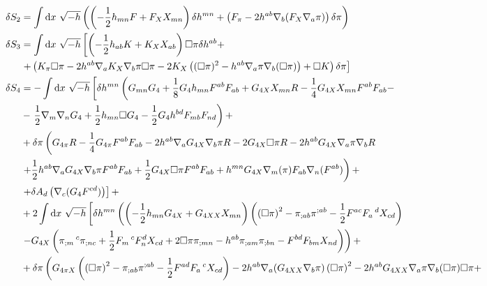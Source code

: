 \documentclass[12pt,a4paper,svgnames]{extarticle}
\begin{document}
\begin{footnotesize}
	\begin{align*}
	 \delta S_{2}& = \int{\rm d}x\,\, \sqrt{-h} \left( \left({ - \frac{1}{2}h_{m n} F+F_{X} X_{m n}}\right)\delta h^{m n}+  \left(F_{\pi}-2h^{a b} \nabla_{b}(F_{X} \nabla_{a}{\pi})\right)\delta\pi\right)\\
	 \delta S_{3} &= \int {\rm d}x\,\, \sqrt{-h}\left[\left( -\frac{1}{2}h_{a b} K + K_{X} X_{a b} \right)\Box{\pi}\delta{h^{a b}}+\right.\\
	& \left.+\left(K_{\pi} \Box\pi -2 h^{a b}\nabla_{a}{K_{X}}\nabla_{b}{\pi}\Box{\pi} - 2 K_{X} \left((\Box{\pi})^2-h^{a b}\nabla_{a}{\pi}\nabla_{b}(\Box{\pi}) \right) + \Box{K} \right)\delta{\pi} \right]\\
	\delta S_{4}& = -\int {\rm d}x\,\, \sqrt{-h}\left[\delta h^{m n} \left(G_{m n}G_{4} +\frac{1}{8}{G_{4}}  h_{m n} F^{a b} F_{a b} + G_{4X} X_{m n} R - \frac{1}{4}G_{4X} X_{m n} F^{a b} F_{a b} - \right.\right.\\
	&-\left. \frac{1}{2}\nabla_{m}\nabla_{n}G_{4} + \frac{1}{2} h_{m n} \Box{G_{4}} - \frac{1}{2}{G_{4}}h^{b d}F_{m b} F_{n d} \right) + \\
	&+ \delta{\pi}\left(G_{4\pi} R - \frac{1}{4}G_{4\pi} F^{a b} F_{a b} -2h^{a b} \nabla_{a}{G_{4X}} \nabla_{b}{\pi} R-2 G_{4X} \Box{\pi} R -2h^{a b} G_{4X} \nabla_{a}{\pi} \nabla_{b}{R}\right.\\
	& \left.+\frac{1}{2}h^{a b} \nabla_{a}{G_{4X}} \nabla_{b}{\pi} F^{a b} F_{a b} +\frac{1}{2} G_{4X} \Box{\pi} F^{a b} F_{a b} +h^{m n} G_{4X} \nabla_{m}{(\pi)} F_{a b}\nabla_{n}{(F^{a b})}\right)+\\
	& \left.+ \delta{A_{d}}\left(\nabla_{c}(G_{4}F^{c d})\right) \right] +\\
	&+ 2 \int {\rm d}x\,\, \sqrt{-h}\left[\delta h^{m n}\left(\left(- \frac{1}{2}h_{m n} G_{4X} + G_{4XX} X_{m n}\right)\left(\left(\Box{\pi}\right)^{2} - \pi_{;a b}\pi^{;a b} - \frac{1}{2} F^{a c} F_{a}\,^{d}X_{c d} \right) \right.\right.\\
	&\left.  -G_{4X} \left(\pi_{;m}\,^{c}\pi_{;n c}  + \frac{1}{2}  F_{m}\,^{c} F_{n}^{d} X_{c d} + 2\Box{\pi} \pi_{;m n} - h^{a b} \pi_{;a m}\pi_{;b n} -  F^{b d}F_{b m}   X_{n d}\right)\right) +\\
	& +\delta\pi \left(G_{4\pi X} \left(\left(\Box{\pi}\right)^{2} -\pi_{;a b}\pi^{;a b}- \frac{1}{2} F^{a d} F_{a}\,^{c} X_{c d}\right) -2h^{a b} \nabla_{a}(G_{4XX} \nabla_{b}{\pi}) \left(\Box{\pi}\right)^{2} -2h^{a b} G_{4XX} \nabla_{a}{\pi} \nabla_{b}({\Box{\pi}})\Box{\pi}+\right.\\

\end{align*}
\end{footnotesize}
\end{document}
